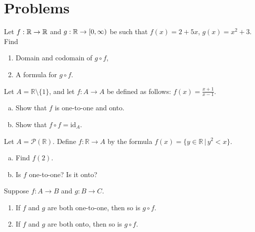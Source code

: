 \documentclass[12pt]{amsart}
\begin{document}
\section{Problems}

\begin{problem}
    Let $f:\mathbb{R}\to \mathbb{R}$ and $g:\mathbb{R} \to [0,\infty)$ be such that
    $f(x) = 2+ 5x$, $g(x) = x^2 +3$.
    Find
    \begin{enumerate}
        \item Domain and codomain of $g\circ f$,
        \item A formula for $g\circ f$.
    \end{enumerate}
\end{problem}

\begin{problem}
    Let $A = \mathbb{R} \setminus \{1\}$, and let $f: A \rightarrow A$ be defined as follows: $f(x) = \frac{x+1}{x-1}$.

    \begin{enumerate}[a.]
        \item  Show that $f$ is one-to-one and onto.
        \item Show that $f \circ f = \text{id}_A$.
    \end{enumerate}

\end{problem}

\begin{problem}
    Let $A = \mathcal{P}(\mathbb{R})$. Define $f: \mathbb{R} \rightarrow A$ by the formula $f(x) = \{y \in \mathbb{R} \,|\, y^2 < x\}$.

    \begin{enumerate}[a.]
        \item Find $f(2)$.
        \item Is $f$ one-to-one? Is it onto?
    \end{enumerate}

\end{problem}

\begin{problem}
    Suppose $f: A \rightarrow B$ and $g: B \rightarrow C$. 
    \begin{enumerate}
        \item If $f$ and $g$ are both one-to-one, then so is $g \circ f$.
        \item If $f$ and $g$ are both onto, then so is $g \circ f$.
    \end{enumerate}

\end{problem}
\end{document}
